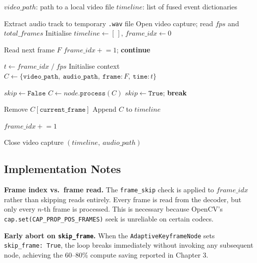 \begin{algorithm}[H]
\caption{\texttt{VideoChain.run(video\_path)}}
\begin{algbox}
\begin{algorithmic}[1]
\Require $video\_path$: path to a local video file
\Ensure $timeline$: list of fused event dictionaries

\State Extract audio track to temporary \texttt{.wav} file
\State Open video capture; read $fps$ and $total\_frames$
\State Initialise $timeline \gets [\,]$, $frame\_idx \gets 0$

    \State Read next frame $F$
        \State $frame\_idx \mathrel{+}= 1$; \textbf{continue}
    \EndIf

    \State $t \gets frame\_idx \;/\; fps$
    \State Initialise context $C \gets \{\texttt{video\_path},\ \texttt{audio\_path},\ \texttt{frame}: F,\ \texttt{time}: t\}$

    \State $skip \gets \texttt{False}$
        \State $C \gets node.\texttt{process}(C)$
            \State $skip \gets \texttt{True}$; \textbf{break}
        \EndIf
    \EndFor

        \State Remove $C[\texttt{current\_frame}]$ 
        \State Append $C$ to $timeline$
    \EndIf

    \State $frame\_idx \mathrel{+}= 1$
\EndWhile

\State Close video capture
\State \Return $(timeline,\ audio\_path)$
\end{algorithmic}
\end{algbox}
\end{algorithm}

\subsection{Implementation Notes}

\textbf{Frame index vs.\ frame read.} The \texttt{frame\_skip} check is applied to $frame\_idx$ rather than skipping reads entirely. Every frame is read from the decoder, but only every $n$-th frame is processed. This is necessary because OpenCV's \texttt{cap.set(CAP\_PROP\_POS\_FRAMES)} seek is unreliable on certain codecs.

\textbf{Early abort on \texttt{skip\_frame}.} When the \texttt{AdaptiveKeyframeNode} sets \texttt{skip\_frame: True}, the loop breaks immediately without invoking any subsequent node, achieving the 60--80\% compute saving reported in Chapter 3.

